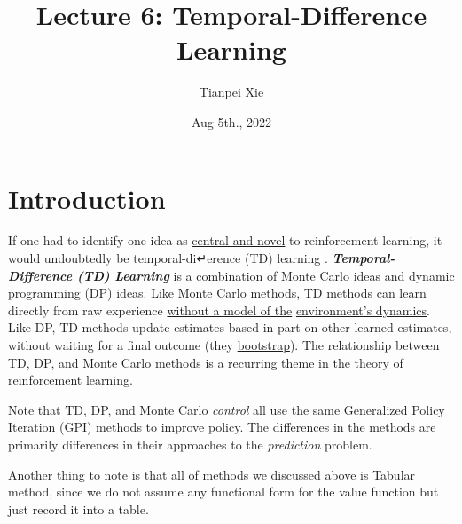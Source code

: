 \documentclass[11pt]{article}
\begin{document}
\title{Lecture 6: Temporal-Difference Learning}
\author{Tianpei Xie}
\date{ Aug 5th., 2022 }
\maketitle
\tableofcontents
\newpage
\section{Introduction}
If one had to identify one idea as \underline{central and novel} to reinforcement learning, it would undoubtedly be temporal-di↵erence (TD) learning \citep{sutton2018reinforcement}.  \textbf{\emph{Temporal-Difference (TD) Learning}} is a combination of Monte Carlo ideas and dynamic programming (DP) ideas. Like Monte Carlo methods, TD methods can learn directly from raw experience \underline{without a model of the}  \underline{environment’s dynamics}. Like DP, TD methods update estimates based in part on other learned estimates, without waiting for a final outcome (they \underline{bootstrap}). The relationship between TD, DP, and Monte Carlo methods is a recurring theme in the theory of reinforcement learning. 

Note that TD, DP, and Monte Carlo \emph{control} all use the same Generalized Policy Iteration (GPI) methods to improve policy. The differences in the methods are primarily differences in their approaches to the \emph{prediction} problem.

Another thing to note is that all of methods we discussed above is  Tabular method, since we do not assume any functional form for the value function but just record it into a table. 
\end{document}
